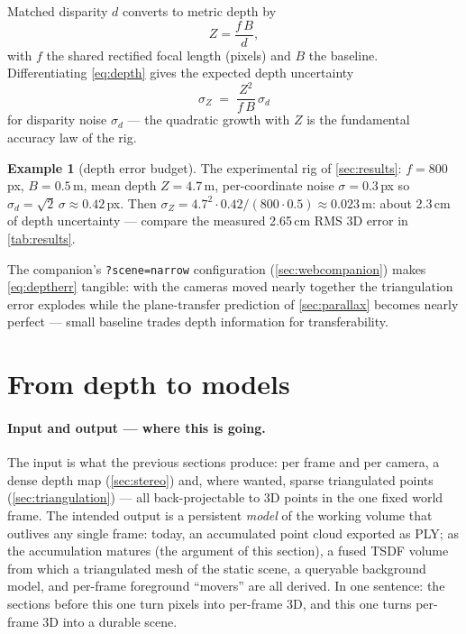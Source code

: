 \documentclass[11pt]{article}
\theoremstyle{definition}
\newtheorem{example}{Example}
\newcommand{\code}[1]{\texttt{#1}}
\begin{document}
Matched disparity $d$ converts to metric depth by
\begin{equation}
Z = \frac{f\,B}{d},
\label{eq:depth}
\end{equation}
with $f$ the shared rectified focal length (pixels) and $B$ the baseline.
Differentiating \eqref{eq:depth} gives the expected depth uncertainty
\begin{equation}
\sigma_Z \;=\; \frac{Z^2}{f\,B}\,\sigma_d
\label{eq:deptherr}
\end{equation}
for disparity noise $\sigma_d$ --- the quadratic growth with $Z$ is the
fundamental accuracy law of the rig.

\begin{example}[depth error budget]
\label{ex:deptherr}
The experimental rig of \autoref{sec:results}: $f=800$\,px, $B=0.5$\,m,
mean depth $Z=4.7$\,m, per-coordinate noise $\sigma=0.3$\,px so
$\sigma_d=\sqrt2\,\sigma\approx0.42$\,px. Then
$\sigma_Z = 4.7^2\cdot 0.42/(800\cdot0.5) \approx 0.023$\,m: about
2.3\,cm of depth uncertainty --- compare the measured 2.65\,cm RMS
3D error in \autoref{tab:results}.
\end{example}

The companion's \code{?scene=narrow} configuration
(\autoref{sec:webcompanion}) makes \eqref{eq:deptherr} tangible: with
the cameras moved nearly together the triangulation error explodes
while the plane-transfer prediction of \autoref{sec:parallax} becomes
nearly perfect --- small baseline trades depth information for
transferability.

\section{From depth to models}
\label{sec:models}

\paragraph{Input and output --- where this is going.} The input is what
the previous sections produce: per frame and per camera, a dense depth
map (\autoref{sec:stereo}) and, where wanted, sparse triangulated points
(\autoref{sec:triangulation}) --- all back-projectable to 3D points in
the one fixed world frame. The intended output is a persistent
\emph{model} of the working volume that outlives any single frame:
today, an accumulated point cloud exported as PLY; as the accumulation
matures (the argument of this section), a fused TSDF volume from which
a triangulated mesh of the static scene, a queryable background model,
and per-frame foreground ``movers'' are all derived. In one sentence:
the sections before this one turn pixels into per-frame 3D, and this
one turns per-frame 3D into a durable scene.
\end{document}
